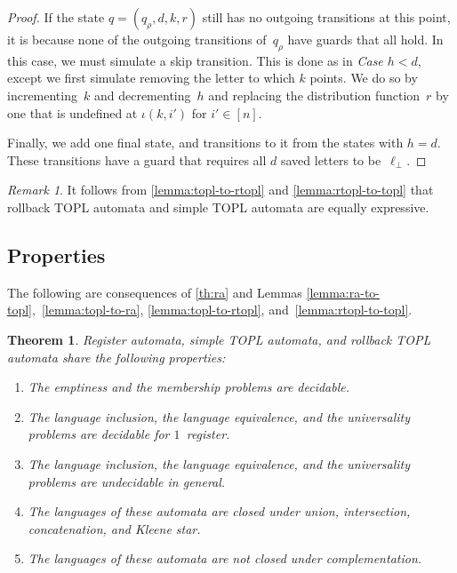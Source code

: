 \documentclass[9pt, preprint]{sigplanconf} %
\newtheorem{theorem}{Theorem}
\theoremstyle{definition}
\theoremstyle{remark}
\newtheorem{remark}{Remark}
\begin{document}
\begin{proof}
If the state $q=(q_\rho,d,k,r)$ still has no outgoing transitions at this point, it is because none of the outgoing transitions of~$q_\rho$ have guards that all hold.
In this case, we must simulate a skip transition.
This is done as in {\it Case $h<d$}, except we first simulate removing the letter to which $k$ points.
We do so by incrementing~$k$ and decrementing~$h$ and
 replacing the distribution function~$r$ by one that is undefined at $\iota(k,i')$ for $i'\in[n]$.

\smallskip
Finally, we add one final state, and transitions to it from the states with $h=d$.
These transitions have a guard that requires all $d$ saved letters to be~$\ell_\bot$.
\end{proof}

\begin{remark}
It follows from \autoref{lemma:topl-to-rtopl} and \autoref{lemma:rtopl-to-topl} that rollback TOPL automata and simple TOPL automata are equally expressive.
\end{remark}

\subsection{Properties} %

The following are consequences of \autoref{th:ra} and Lemmas \ref{lemma:ra-to-topl},~\ref{lemma:topl-to-ra}, \ref{lemma:topl-to-rtopl}, and~\ref{lemma:rtopl-to-topl}.

\begin{theorem}\label{th:main}
Register automata, simple TOPL automata, and rollback TOPL automata share the following properties:
\begin{enumerate}
\item The emptiness and the membership problems are decidable.
\item The language inclusion, the language equivalence, and the universality problems are decidable for $1$~register.
\item The language inclusion, the language equivalence, and the universality problems are undecidable in general.
\item The languages of these automata are closed under union, intersection, concatenation, and Kleene star.
\item The languages of these automata are not closed under complementation.
\end{enumerate}
\end{theorem}

\end{document}
